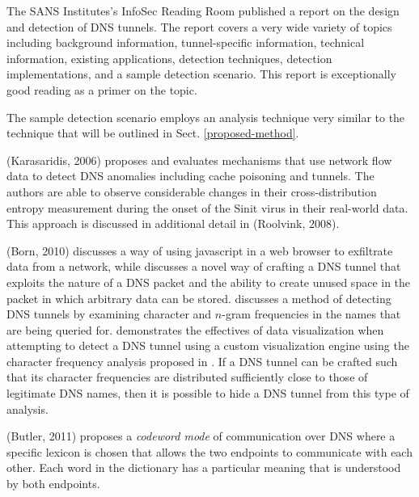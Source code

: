 \documentclass{llncs}
\begin{document}
\label{litreview-dns}
The SANS
Institutes's InfoSec Reading Room published a report on the design and detection
of DNS tunnels\cite{SANS2013}. The report covers a very wide variety of topics
including background information, tunnel-specific information, technical
information, existing applications, detection techniques, detection
implementations, and a sample detection scenario. This report is exceptionally
good reading as a primer on the topic.

The sample detection scenario employs an analysis technique very similar to the
technique that will be outlined in Sect. \ref{proposed-method}.

(Karasaridis, 2006)\cite{Karasaridis2006} proposes and evaluates mechanisms that
use network flow data
 to detect DNS anomalies including cache
poisoning and tunnels. The
authors are able to observe considerable changes in their cross-distribution
entropy measurement during the onset of the Sinit virus in their real-world
data. This approach is discussed in additional detail in (Roolvink,
2008)\cite{Roolvink2008}.

\label{litreview-dns-cfa} (Born, 2010)\cite{Born2010.exfil} discusses a way of
using javascript in a web browser to exfiltrate data from a network, while
\cite{Born2010.psudp} discusses a novel way of crafting a DNS tunnel that
exploits the nature of a DNS packet and the ability to create unused space in
the packet in which arbitrary data can be stored. \cite{Born2010.cfa} discusses
a method of detecting DNS tunnels by examining character and $n$-gram
frequencies in the names that are being queried for. \cite{Born2010.ngviz}
demonstrates the effectives of data visualization when attempting to detect a
DNS tunnel using a custom visualization engine using the character frequency
analysis proposed in \cite{Born2010.cfa}. If a DNS tunnel
can be crafted such that its character frequencies are distributed sufficiently
close to those of legitimate DNS names, then it is possible to hide a DNS tunnel
from this type of analysis.

(Butler, 2011)\cite{Butler2011} 
proposes a \emph{codeword mode} of communication over DNS where a specific
lexicon is chosen that allows the two endpoints to communicate with each other.
Each word in the dictionary has a particular meaning
 that is understood by
both endpoints.
\end{document}
